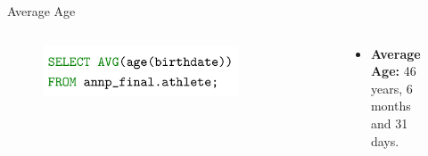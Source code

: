 \documentclass[aspectratio=169, xcolor=dvipsnames]{beamer}
\begin{document}
\begin{frame}{Average Age}
\begin{columns}[c]
\begin{column}{.5\textwidth}
\begin{figure}
    \centering
    \includegraphics[width=0.9\textwidth]{img/sql/avgage.png}
\end{figure}
\end{column}

\begin{column}{.5\textwidth}
\begin{figure}
    \begin{itemize}
        \item \textbf{Average Age:} 46 years, 6 months and 31 days.
    \end{itemize}
\end{figure}
\end{column}
\end{columns}
\end{frame}
\end{document}
